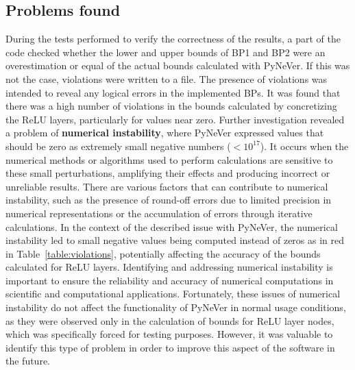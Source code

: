 \subsection{Problems found}
During the tests performed to verify the correctness of the results, a part of the code checked whether the lower and upper bounds of BP1 and BP2 were an overestimation or equal of the actual bounds calculated with PyNeVer. If this was not the case, violations were written to a file. The presence of violations was intended to reveal any logical errors in the implemented BPs.
It was found that there was a high number of violations in the bounds calculated by concretizing the ReLU layers, particularly for values near zero. Further investigation revealed a problem of \textbf{numerical instability}, where PyNeVer expressed values that should be zero as extremely small negative numbers ($<10^{17}$).
It occurs when the numerical methods or algorithms used to perform calculations are sensitive to these small perturbations, amplifying their effects and producing incorrect or unreliable results.
There are various factors that can contribute to numerical instability, such as the presence of round-off errors due to limited precision in numerical representations or the accumulation of errors through iterative calculations.
In the context of the described issue with PyNeVer, the numerical instability led to small negative values being computed instead of zeros as in red in Table~\ref{table:violations}, potentially affecting the accuracy of the bounds calculated for ReLU layers. Identifying and addressing numerical instability is important to ensure the reliability and accuracy of numerical computations in scientific and computational applications.
Fortunately, these issues of numerical instability do not affect the functionality of PyNeVer in normal usage conditions, as they were observed only in the calculation of bounds for ReLU layer nodes, which was specifically forced for testing purposes. However, it was valuable to identify this type of problem in order to improve this aspect of the software in the future.

\

